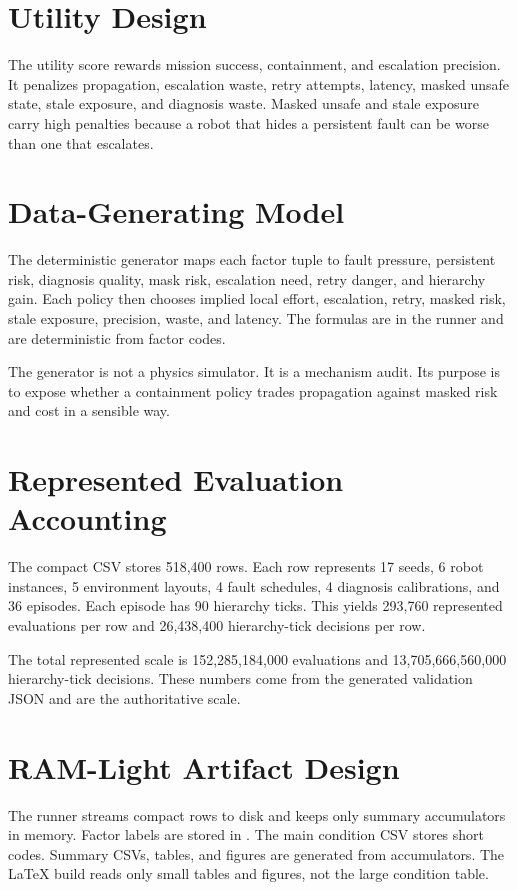 \documentclass{article}
\begin{document}
\section{Utility Design}

The utility score rewards mission success, containment, and escalation precision. It penalizes propagation, escalation waste, retry attempts, latency, masked unsafe state, stale exposure, and diagnosis waste. Masked unsafe and stale exposure carry high penalties because a robot that hides a persistent fault can be worse than one that escalates.

\section{Data-Generating Model}

The deterministic generator maps each factor tuple to fault pressure, persistent risk, diagnosis quality, mask risk, escalation need, retry danger, and hierarchy gain. Each policy then chooses implied local effort, escalation, retry, masked risk, stale exposure, precision, waste, and latency. The formulas are in the runner and are deterministic from factor codes.

The generator is not a physics simulator. It is a mechanism audit. Its purpose is to expose whether a containment policy trades propagation against masked risk and cost in a sensible way.

\section{Represented Evaluation Accounting}

The compact CSV stores 518,400 rows. Each row represents 17 seeds, 6 robot instances, 5 environment layouts, 4 fault schedules, 4 diagnosis calibrations, and 36 episodes. Each episode has 90 hierarchy ticks. This yields 293,760 represented evaluations per row and 26,438,400 hierarchy-tick decisions per row.

The total represented scale is 152,285,184,000 evaluations and 13,705,666,560,000 hierarchy-tick decisions. These numbers come from the generated validation JSON and are the authoritative scale.

\section{RAM-Light Artifact Design}

The runner streams compact rows to disk and keeps only summary accumulators in memory. Factor labels are stored in . The main condition CSV stores short codes. Summary CSVs, tables, and figures are generated from accumulators. The LaTeX build reads only small tables and figures, not the large condition table.
\end{document}
